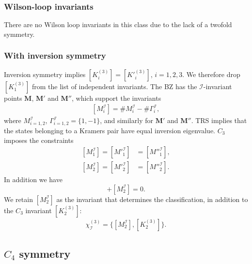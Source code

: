 \subsubsection*{Wilson-loop invariants} 
There are no Wilson loop invariants in this class due to the lack of a twofold symmetry.

\subsubsection*{With inversion symmetry} 
Inversion symmetry implies $[K^{(3)}_i] = [K'^{(3)}_i]$, $i = 1,2,3$. We therefore drop $[K^{(3)}_1]$ from the list of independent invariants.
The BZ has the $\mathcal{I}$-invariant points $\mathbf{M}$, $\mathbf{M'}$ and $\mathbf{M''}$, which support the invariants
\begin{equation}
\begin{aligned}
[M^\mathcal{I}_i]= \#M^\mathcal{I}_i - \#\Gamma^{\mathcal{I}}_i,
\end{aligned} 
\end{equation}
where $M^\mathcal{I}_{i=1,2}$, $\Gamma^{\mathcal{I}}_{i=1,2}=\{1,-1\}$, and similarly for $\mathbf{M'}$ and $\mathbf{M''}$. TRS implies that the states belonging to a Kramers pair have equal inversion eigenvalue. $C_3$ imposes the constraints
\begin{equation} 
\begin{aligned}
[M^\mathcal{I}_1] = [M'^{\mathcal{I}}_1] &= [M''^{\mathcal{I}}_1], \\
[M^\mathcal{I}_2] = [M'^{\mathcal{I}}_2] &= [M''^{\mathcal{I}}_2].
\end{aligned} 
\label{eq:C3_constraintsForInversion}
\end{equation}
In addition we have
\begin{equation}
[M^\mathcal{I}_1]+[M^\mathcal{I}_2]=0.
\end{equation}
We retain $[M^\mathcal{I}_2]$ as the invariant that determines the classification, in addition to the $C_3$ invariant $[K^{(3)}_2]$:
\begin{equation} 
\begin{aligned}
\chi^{(3)}_\mathcal{I}=\{[M^\mathcal{I}_2],[K^{(3)}_2]\}.
\end{aligned} 
\end{equation}
\subsection{$C_4$ symmetry}
